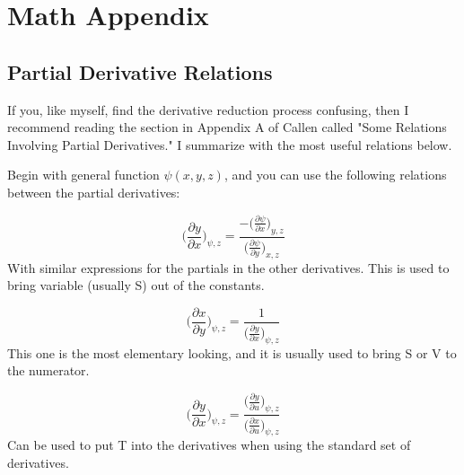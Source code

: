 
\newpage
\renewcommand\thesubsection{\Alph{subsection}}

{}
\section*{Math Appendix}


\subsection{Partial Derivative Relations}
\label{subsec::partials}

If you, like myself, find the derivative reduction process confusing, then I recommend reading the section in Appendix A of Callen called "Some Relations Involving Partial Derivatives." I summarize with the most useful relations below.

Begin with general function $\psi(x,y,z)$, and you can use the following relations between the partial derivatives:

\[
    \bigg(\frac{\partial y}{\partial x} \bigg)_{\psi,z} = \frac{-\Big(\frac{\partial \psi}{\partial x}\Big)_{y,z}} {\Big(\frac{\partial \psi}{\partial y}\Big)_{x,z}}   
\]
With similar expressions for the partials in the other derivatives. This is used to bring variable (usually S) out of the constants.

\[
    \bigg(\frac{\partial x}{\partial y} \bigg)_{\psi,z} = \frac{1} {\Big(\frac{\partial y}{\partial x}\Big)_{\psi,z}} 
\]
This one is the most elementary looking, and it is usually used to bring S or V to the numerator.

\[
    \bigg(\frac{\partial y}{\partial x} \bigg)_{\psi,z} = \frac{\Big(\frac{\partial y}{\partial u}\Big)_{\psi,z}} {\Big(\frac{\partial x}{\partial u}\Big)_{\psi,z}}
\]
Can be used to put T into the derivatives when using the standard set of derivatives.